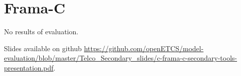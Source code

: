 \chapter{Frama-C}
\label{sec:framaC}

No results of evaluation.

Slides available on github \url{https://github.com/openETCS/model-evaluation/blob/master/Telco_Secondary_slides/c-frama-c-secondary-tools-presentation.pdf}.